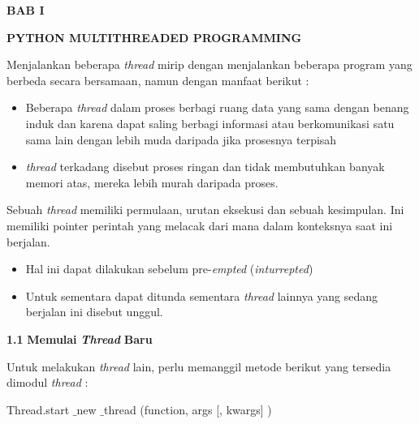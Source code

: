 \documentclass[a4paper,12pt]{report}
\begin{document}
\sloppy
\begin{center}{\fontsize{14pt}{14pt}\selectfont \textbf{BAB I} \\}\end{center} \par
\noindent 
\begin{center}{\fontsize{14pt}{14pt}\selectfont \textbf{PYTHON MULTITHREADED PROGRAMMING} \\}\end{center} \par
\vspace{14pt}
\vspace{14pt}
Menjalankan beberapa\textit{ thread} mirip dengan menjalankan beberapa program yang berbeda secara bersamaan, namun dengan manfaat berikut : \par
\begin{itemize}
\item Beberapa \textit{thread} dalam proses berbagi ruang data yang sama dengan benang induk dan karena dapat saling berbagi informasi atau berkomunikasi satu sama lain dengan lebih muda daripada jika prosesnya terpisah \par
\item \textit{thread} terkadang disebut proses ringan dan tidak membutuhkan banyak memori atas, mereka lebih murah daripada proses.\end{itemize}
 \par
Sebuah \textit{thread} memiliki permulaan, urutan eksekusi dan sebuah kesimpulan. Ini memiliki pointer perintah yang melacak dari mana dalam konteksnya saat ini berjalan.  \par
\noindent 
\begin{itemize}
\item Hal ini dapat dilakukan sebelum pre-\textit{empted} (\textit{inturrepted}) \par
\noindent 
\item Untuk sementara dapat ditunda sementara \textit{thread} lainnya yang sedang berjalan ini disebut unggul. \end{itemize}
 \par
\noindent 
\textbf{1.}\textbf{1 }\textbf{Memulai }\textbf{\textit{Thread}}\textbf{ Baru} \par
\noindent 
 \hspace*{0.5in} Untuk melakukan \textit{thread} lain, perlu memanggil metode berikut yang tersedia dimodul \textit{thread} : \par
\noindent 
\begin{center}{\fontsize{9pt}{9pt}\selectfont Thread.start $  \_  $new $  \_  $thread (function, args [, kwargs] )}\end{center} \par
\end{document}
